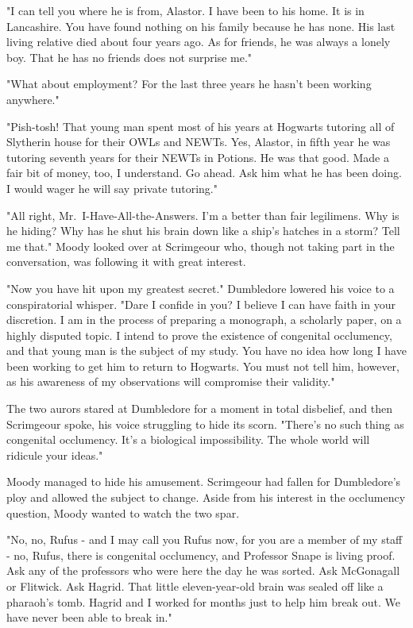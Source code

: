 "I can tell you where he is from, Alastor. I have been to his home. It is in Lancashire. You have found nothing on his family because he has none. His last living relative died about four years ago. As for friends, he was always a lonely boy. That he has no friends does not surprise me."

"What about employment? For the last three years he hasn't been working anywhere."

"Pish-tosh! That young man spent most of his years at Hogwarts tutoring all of Slytherin house for their OWLs and NEWTs. Yes, Alastor, in fifth year he was tutoring seventh years for their NEWTs in Potions. He was that good. Made a fair bit of money, too, I understand. Go ahead. Ask him what he has been doing. I would wager he will say private tutoring."

"All right, Mr.~I-Have-All-the-Answers. I'm a better than fair legilimens. Why is he hiding? Why has he shut his brain down like a ship's hatches in a storm? Tell me that." Moody looked over at Scrimgeour who, though not taking part in the conversation, was following it with great interest.

"Now you have hit upon my greatest secret." Dumbledore lowered his voice to a conspiratorial whisper. "Dare I confide in you? I believe I can have faith in your discretion. I am in the process of preparing a monograph, a scholarly paper, on a highly disputed topic. I intend to prove the existence of congenital occlumency, and that young man is the subject of my study. You have no idea how long I have been working to get him to return to Hogwarts. You must not tell him, however, as his awareness of my observations will compromise their validity."

The two aurors stared at Dumbledore for a moment in total disbelief, and then Scrimgeour spoke, his voice struggling to hide its scorn. "There's no such thing as congenital occlumency. It's a biological impossibility. The whole world will ridicule your ideas."

Moody managed to hide his amusement. Scrimgeour had fallen for Dumbledore's ploy and allowed the subject to change. Aside from his interest in the occlumency question, Moody wanted to watch the two spar.

"No, no, Rufus - and I may call you Rufus now, for you are a member of my staff - no, Rufus, there is congenital occlumency, and Professor Snape is living proof. Ask any of the professors who were here the day he was sorted. Ask McGonagall or Flitwick. Ask Hagrid. That little eleven-year-old brain was sealed off like a pharaoh's tomb. Hagrid and I worked for months just to help him break out. We have never been able to break in."

